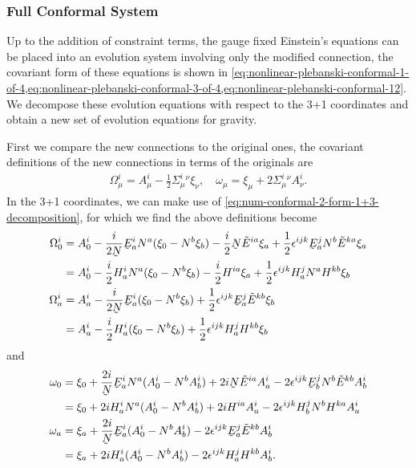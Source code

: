 \documentclass[10pt]{report}
\newcommand{\utilde}[1]{\underaccent{\tilde}{#1}}
\theoremstyle{definition}
\newcommand{\tE}[0]{\tilde{E}}
\newcommand{\dlap}[0]{\utilde{N}}
\newcommand{\utE}[0]{\utilde{E}}
\begin{document}
        \subsubsection{Full Conformal System}
        Up to the addition of constraint terms, the gauge fixed Einstein's equations can be placed into an evolution system involving only the modified connection, the covariant form of these equations is shown in \cref{eq:nonlinear-plebanski-conformal-1-of-4,eq:nonlinear-plebanski-conformal-3-of-4,eq:nonlinear-plebanski-conformal-12}. We decompose these evolution equations with respect to the 3+1 coordinates and obtain a new set of evolution equations for gravity. 
        
        First we compare the new connections to the original ones, the covariant definitions of the new connections in terms of the originals are
        \begin{align}
            \Omega^i_\mu = A^i_\mu - \frac{1}{2} \Sigma^i_\mu{}^\nu \xi_\nu, \quad \omega_\mu = \xi_\mu + 2 \Sigma^i_\mu{}^\nu A^i_\nu.
        \end{align}
        In the 3+1 coordinates, we can make use of \cref{eq:num-conformal-2-form-1+3-decomposition}, for which we find the above definitions become
        \begin{align}
            \Omega^i_0 & = A^i_0 - \frac{i}{2\dlap} \utE^i_a N^a (\xi_0 - N^b \xi_b) - \frac{i}{2} \dlap \tE^{ia} \xi_a + \frac{1}{2} \epsilon^{ijk} \utE^j_a N^b \tE^{ka} \xi_a \nonumber \\ & = A^i_0 - \frac{i}{2} H^i_a N^a ( \xi_0 - N^b \xi_b) - \frac{i}{2} H^{ia} \xi_a + \frac{1}{2} \epsilon^{ijk} H^j_a N^a H^{kb} \xi_b \\
            \Omega^i_a & = A^i_a - \frac{i}{2\dlap} \utE^i_a (\xi_0 - N^b \xi_b) + \frac{1}{2} \epsilon^{ijk} \utE^j_a \tE^{kb} \xi_b \nonumber \\ & = A^i_a - \frac{i}{2} H^i_a (\xi_0 - N^b \xi_b) + \frac{1}{2} \epsilon^{ijk} H^j_a H^{kb} \xi_b
        \end{align}
        and
        \begin{align}
            \omega_0 & = \xi_0 + \frac{2i}{\dlap} \utE^i_a N^a (A^i_0 - N^b A^i_b) + 2i\dlap \tE^{ia} A^i_a - 2 \epsilon^{ijk} \utE^j_b N^b \tE^{kb} A^i_b \nonumber \\ & = \xi_0 + 2iH^i_a N^a (A^i_0 - N^b A^i_b) + 2iH^{ia} A^i_a - 2 \epsilon^{ijk} H^j_b N^b H^{ka} A^i_a \\
            \omega_a & = \xi_a + \frac{2i}{\dlap} \utE^i_a (A^i_0 - N^b A^i_b) - 2 \epsilon^{ijk} \utE^j_a \tE^{kb} A^i_b \nonumber \\ & = \xi_a + 2i H^i_a (A^i_0 - N^b A^i_b) - 2 \epsilon^{ijk} H^j_a H^{kb} A^i_b.
        \end{align}
\end{document}
